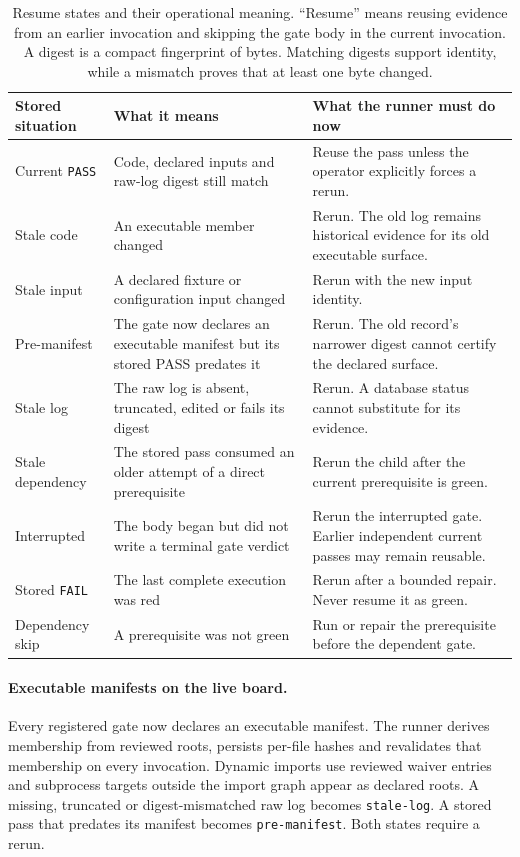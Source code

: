 \documentclass[10pt,aps,prd,twocolumn,nofootinbib]{revtex4-2}
\newcommand{\code}[1]{\texttt{#1}}
\begin{document}
\begin{table}[t]
\centering
\begin{tabular}{p{}p{}p{}}
\toprule
Stored situation & What it means & What the runner must do now \\
\midrule
Current \code{PASS} & Code, declared inputs and raw-log digest still match &
Reuse the pass unless the operator explicitly forces a rerun.  \\
Stale code & An executable member changed & Rerun.  The old log remains
historical evidence for its old executable surface.  \\
Stale input & A declared fixture or configuration input changed & Rerun with
the new input identity.  \\
Pre-manifest & The gate now declares an executable manifest but its stored
PASS predates it & Rerun.  The old record's narrower digest cannot certify
the declared surface.  \\
Stale log & The raw log is absent, truncated, edited or fails its digest &
Rerun.  A database status cannot substitute for its evidence.  \\
Stale dependency & The stored pass consumed an older attempt of a direct
prerequisite & Rerun the child after the current prerequisite is green.  \\
Interrupted & The body began but did not write a terminal gate verdict &
Rerun the interrupted gate.  Earlier independent current passes may remain
reusable.  \\
Stored \code{FAIL} & The last complete execution was red & Rerun after a
bounded repair.  Never resume it as green.  \\
Dependency skip & A prerequisite was not green & Run or repair the
prerequisite before the dependent gate.  \\
\bottomrule
\end{tabular}
\caption{Resume states and their operational meaning.  ``Resume'' means
reusing evidence from an earlier invocation and skipping the gate body in the
current invocation.  A digest is a compact fingerprint of bytes.  Matching digests
support identity, while a mismatch proves that at least one byte changed.}
\label{tab:resume-states}
\end{table}

\paragraph{Executable manifests on the live board.}
Every registered gate now declares an executable manifest.  The runner derives
membership from reviewed roots, persists per-file hashes and revalidates that
membership on every invocation.  Dynamic imports use reviewed waiver entries
and subprocess targets outside the import graph appear as declared roots.  A
missing, truncated or digest-mismatched raw log becomes \code{stale-log}.  A
stored pass that predates its manifest becomes \code{pre-manifest}.  Both
states require a rerun.
\end{document}
